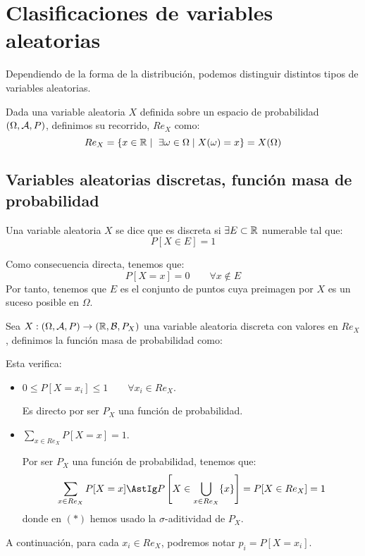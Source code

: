 \section{Clasificaciones de variables aleatorias}

Dependiendo de la forma de la distribución, podemos distinguir distintos tipos de variables aleatorias.
\begin{definicion}
    Dada una variable aleatoria $X$ definida sobre un espacio de probabilidad $(\Omega, \mathcal{A}, P)$, definimos su recorrido, $Re_X$ como:
    $$Re_X = \{x \in \mathbb R \mid \ \exists \omega \in \Omega \mid X(\omega) = x\} = X(\Omega)$$
\end{definicion}

\subsection{Variables aleatorias discretas, función masa de probabilidad}

\begin{definicion}
    Una variable aleatoria $X$ se dice que es discreta si $\exists E \subset \mathbb R$ numerable tal que:
    \begin{equation*}
        P[X \in E] = 1
    \end{equation*}
\end{definicion}

Como consecuencia directa, tenemos que:
\begin{equation*}
    P[X=x] = 0\qquad \forall x \notin E
\end{equation*}
Por tanto, tenemos que $E$ es el conjunto de puntos cuya preimagen por $X$ es un suceso posible en $\Omega$.

\begin{definicion}
    Sea $X: (\Omega, \mathcal{A}, P) \rightarrow (\mathbb R, \mathcal{B}, P_X)$ una variable aleatoria discreta con valores en $Re_X$, definimos la función masa de probabilidad como:
\end{definicion}
Esta verifica:
\begin{itemize}
    \item $0 \leq P[X=x_i] \leq 1 \qquad \forall x_i \in Re_X$.
    
    Es directo por ser $P_X$ una función de probabilidad.
    \item $\sum\limits_{x\in Re_X} P[X=x] = 1$.
    
    Por ser $P_X$ una función de probabilidad, tenemos que:
    \begin{equation*}
        \sum_{x\in Re_X} P[X=x] \AstIg P\left[X\in \bigcup_{x\in Re_X} \{x\}\right] = P[X\in Re_X] = 1
    \end{equation*}
    donde en $(\ast)$ hemos usado la $\sigma$-aditividad de $P_X$.
\end{itemize}
\begin{notacion}
    A continuación, para cada $x_i \in Re_X$, podremos notar $p_i = P[X=x_i]$.
\end{notacion}

